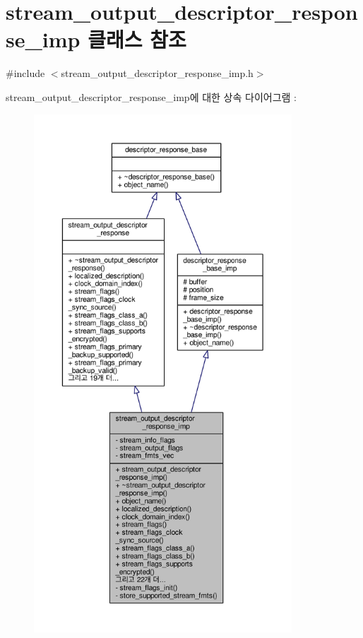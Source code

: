 \hypertarget{classavdecc__lib_1_1stream__output__descriptor__response__imp}{}\section{stream\+\_\+output\+\_\+descriptor\+\_\+response\+\_\+imp 클래스 참조}
\label{classavdecc__lib_1_1stream__output__descriptor__response__imp}


{\ttfamily \#include $<$stream\+\_\+output\+\_\+descriptor\+\_\+response\+\_\+imp.\+h$>$}



stream\+\_\+output\+\_\+descriptor\+\_\+response\+\_\+imp에 대한 상속 다이어그램 \+: 
\nopagebreak
\begin{figure}[H]
\begin{center}
\leavevmode
\includegraphics[height=550pt]{classavdecc__lib_1_1stream__output__descriptor__response__imp__inherit__graph}
\end{center}
\end{figure}


